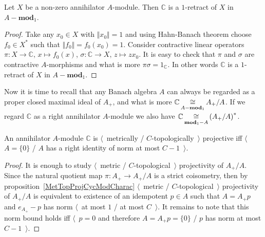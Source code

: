 \begin{proposition}\label{AnnihCModIsRetAnnihMod} Let $X$ be a non-zero
annihilator $A$-module. Then $\mathbb{C}$ is a $1$-retract of $X$ in
$A-\mathbf{mod}_1$.
\end{proposition}
\begin{proof} Take any $x_0\in X$ with $\Vert x_0\Vert=1$ and using Hahn-Banach
theorem choose $f_0\in X^*$ such that $\Vert f_0\Vert=f_0(x_0)=1$. Consider
contractive linear operators $\pi:X\to \mathbb{C},\, x\mapsto f_0(x)$,
$\sigma:\mathbb{C}\to X,\, z\mapsto zx_0$. It is easy to check that $\pi$ and
$\sigma$ are contractive $A$-morphisms and what is more
$\pi\sigma=1_\mathbb{C}$. In other words $\mathbb{C}$ is a $1$-retract of $X$ in
$A-\mathbf{mod}_1$.
\end{proof}

Now it is time to recall that any Banach algebra $A$ can always be regarded as a 
proper closed maximal ideal of $A_+$, and what is more
$\mathbb{C}\mathop{\mathbin{\cong}}\limits_{A-\mathbf{mod}_1} A_+/A$. If we regard $\mathbb{C}$ as a right
annihilator $A$-module we also have
$\mathbb{C}\mathop{\mathbin{\cong}}\limits_{\mathbf{mod}_1-A}{(A_+/A)}^*$. 

\begin{proposition}\label{MetTopProjModCCharac} An annihilator $A$-module
$\mathbb{C}$ is $\langle$~metrically / $C$-topologically~$\rangle$ projective
iff $\langle$~$A= \{0 \}$ / $A$ has a right identity of norm at most
$C-1$~$\rangle$.
\end{proposition}
\begin{proof} 
It is enough to study $\langle$~metric / $C$-topological~$\rangle$ projectivity
of $A_+/A$. Since the natural quotient map $\pi:A_+\to A_+/A$ is a strict
coisometry, then by proposition~\ref{MetTopProjCycModCharac} $\langle$~metric /
$C$-topological~$\rangle$ projectivity of $A_+/A$ is equivalent to existence of 
an idempotent $p\in A$ such that $A=A_+p$ and $e_{A_+}-p$ has norm $\langle$~at
most $1$ / at most $C$~$\rangle$. It remains to note that this norm bound holds
iff $\langle$~$p=0$ and therefore $A=A_+p= \{0 \}$ / $p$ has norm at most
$C-1$~$\rangle$.
\end{proof}

